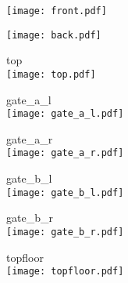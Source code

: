 \documentclass[10pt,a4paper]{article}
\begin{document}
\begin{landscape}
\texttt{[image: front.pdf]}

\texttt{[image: back.pdf]}
\end{landscape}


top\\
\texttt{[image: top.pdf]}

gate\_a\_l\\
\texttt{[image: gate\_a\_l.pdf]}

gate\_a\_r\\
\texttt{[image: gate\_a\_r.pdf]}

gate\_b\_l\\
\texttt{[image: gate\_b\_l.pdf]}

gate\_b\_r\\
\texttt{[image: gate\_b\_r.pdf]}

topfloor\\
\texttt{[image: topfloor.pdf]}
\end{document}
